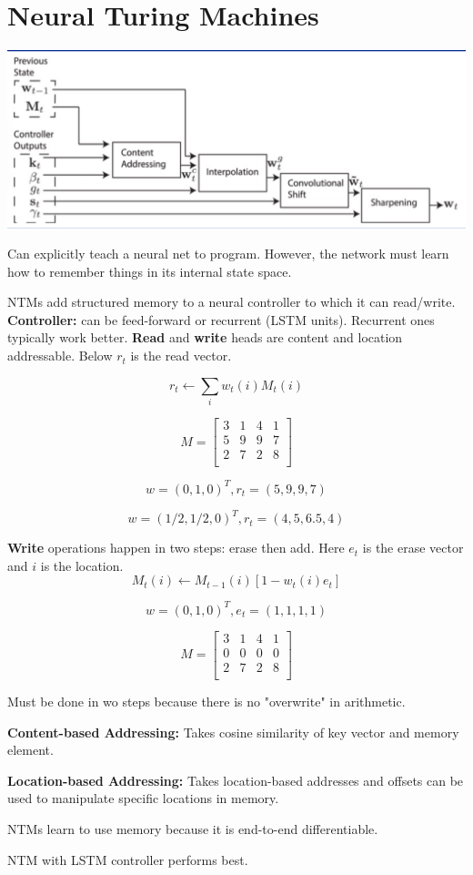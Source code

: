 \section{Neural Turing Machines}

\includegraphics[width=0.9\linewidth]{images/neural_tm}

Can explicitly teach a neural net to program. However, the network must learn how to remember things in its internal state space.

NTMs add structured memory to a neural controller to which it can read/write. \textbf{Controller:} can be feed-forward or recurrent (LSTM units). Recurrent ones typically work better. \textbf{Read} and \textbf{write} heads are content and location addressable. Below $r_t$ is the read vector.

$$ r_t \leftarrow \sum_i w_t(i) M_t(i) $$

$$
M = \begin{bmatrix}
  3 & 1 & 4 & 1 \\
  5 & 9 & 9 & 7 \\
  2 & 7 & 2 & 8 \\
\end{bmatrix}
$$

\[ w = (0, 1, 0)^T, r_t = (5, 9, 9, 7) \]

\[ w = (1/2, 1/2, 0)^T, r_t = (4, 5, 6.5, 4) \]

\textbf{Write} operations happen in two steps: erase then add. Here $e_t$ is the erase vector and $i$ is the location.
$$ M_t(i) \leftarrow M_{t - 1}(i)[1 - w_t(i)e_t]$$

\[ w = (0, 1, 0)^T, e_t = (1, 1, 1, 1) \]

$$
M = \begin{bmatrix}
  3 & 1 & 4 & 1 \\
  0 & 0 & 0 & 0 \\
  2 & 7 & 2 & 8 \\
\end{bmatrix}
$$

Must be done in wo steps because there is no "overwrite" in arithmetic. 

\textbf{Content-based Addressing:} Takes cosine similarity of key vector and memory element. 

\textbf{Location-based Addressing:} Takes location-based addresses and offsets can be used to manipulate specific locations in memory.

NTMs learn to use memory because it is end-to-end differentiable.

NTM with LSTM controller performs best. 
